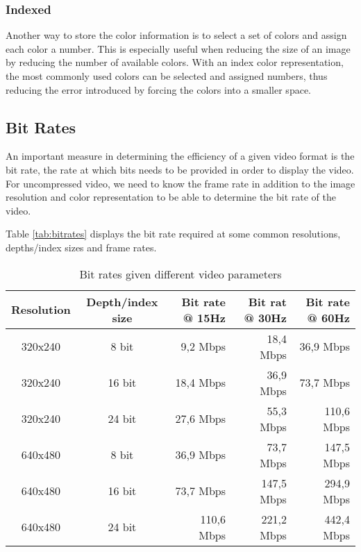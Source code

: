 \subsubsection{Indexed}
Another way to store the color information is to select a set of colors and assign each color a number.
This is especially useful when reducing the size of an image by reducing the number of available colors.
With an index color representation, the most commonly used colors can be selected and assigned numbers, thus reducing the error introduced by forcing the colors into a smaller space.

\subsection{Bit Rates}
An important measure in determining the efficiency of a given video format is the bit rate, the rate at which bits needs to be provided in order to display the video.
For uncompressed video, we need to know the frame rate in addition to the image resolution and color representation to be able to determine the bit rate of the video.

Table \ref{tab:bitrates} displays the bit rate required at some common resolutions, depths/index sizes and frame rates.
\begin{table}[]
    \centering
    \begin{tabular}{ccrrr}
        Resolution & Depth/index size & Bit rate @ 15Hz & Bit rat @ 30Hz & Bit rate @ 60Hz \\
        \hline
        320x240 & 8 bit & 9,2 Mbps   & 18,4 Mbps  & 36,9 Mbps  \\
        320x240 & 16 bit & 18,4 Mbps  & 36,9 Mbps  & 73,7 Mbps  \\
        320x240 & 24 bit & 27,6 Mbps  & 55,3 Mbps  & 110,6 Mbps \\
        640x480 & 8 bit & 36,9 Mbps  & 73,7 Mbps  & 147,5 Mbps \\
        640x480 & 16 bit & 73,7 Mbps  & 147,5 Mbps & 294,9 Mbps \\
        640x480 & 24 bit & 110,6 Mbps & 221,2 Mbps & 442,4 Mbps
    \end{tabular}
    \label{fig:bitrates}
    \caption{Bit rates given different video parameters}
\end{table}
